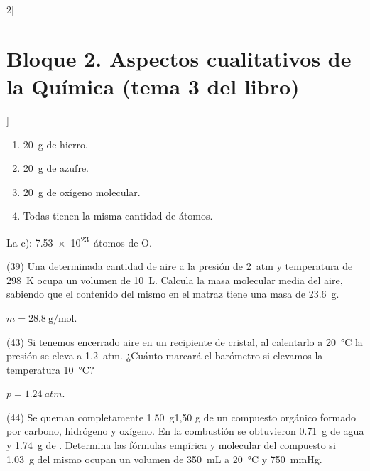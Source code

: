 \documentclass[10pt]{article}
\begin{document}
\begin{multicols}{2}[
    \section{Bloque 2. Aspectos cualitativos de la Química (tema 3 del libro)}
  ]
\begin{exercise}[
    tags    = {},
    topics  = {química,química básica},
    source  = {FQ 1B MGH 2016, p85, e38},
  ]
  \begin{enumerate}
    \item \SI{20}{\gram} de hierro.
    \item \SI{20}{\gram} de azufre.
    \item \SI{20}{\gram} de oxígeno molecular.
    \item Todas tienen la misma cantidad de átomos.
  \end{enumerate}
\end{exercise}

\begin{solution}
  La c): \SI{7.53e23}{átomos} de O.
\end{solution}




\begin{exercise}[
    tags    = {},
    topics  = {química,química básica},
    source  = {FQ 1B MGH 2016, p85, e39},
  ]
  (39) Una determinada cantidad de aire a la presión de \SI{2}{atm} y
  temperatura de \SI{298}{\kelvin} ocupa un volumen de \SI{10}{\liter}. Calcula la masa molecular media del aire, sabiendo que el contenido del
  mismo en el matraz tiene una masa de \SI{23.6}{\gram}.
\end{exercise}

\begin{solution}
  \( m = \SI{28.8}{\gram\per\mole} \).
\end{solution}




\begin{exercise}[
    tags    = {},
    topics  = {química,química básica},
    source  = {FQ 1B MGH 2016, p86, e43},
  ]
  (43) Si tenemos encerrado aire en un recipiente de cristal, al
  calentarlo a \SI{20}{\celsius} la presión se eleva a \SI{1.2}{atm}. ¿Cuánto marcará el barómetro si elevamos la temperatura \SI{10}{\celsius}?
\end{exercise}

\begin{solution}
  \( p = \SI{1.24}{atm} \).
\end{solution}




\begin{exercise}[
    tags    = {},
    topics  = {química,química básica},
    source  = {FQ 1B MGH 2016, p86, e44},
  ]
  (44) Se queman completamente \SI{1.50}{\gram}1,50 g de un compuesto orgánico
  formado por carbono, hidrógeno y oxígeno. En la combustión
  se obtuvieron \SI{0.71}{\gram} de agua y \SI{1.74}{\gram} de . Determina las fórmulas empírica y molecular del compuesto si
  \SI{1.03}{\gram} del mismo ocupan un volumen de \SI{350}{\milli\liter} a \SI{20}{\celsius} y \SI{750}{\mmHg}.
\end{exercise}


\end{multicols}
\end{document}

